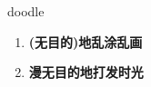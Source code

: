 
\begin{frame}
{\huge doodle}
\begin{center}
\begin{enumerate}\Large
  \item \textbf{(无目的)地乱涂乱画}
  \item \textbf{漫无目的地打发时光}
\end{enumerate}
\end{center}
\end{frame}

